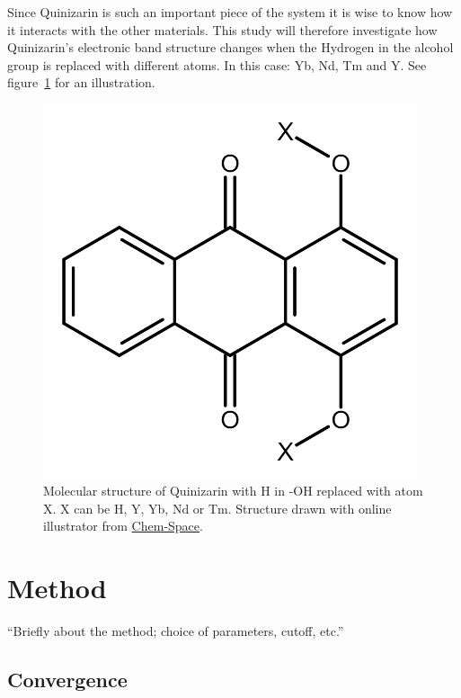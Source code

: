 \documentclass{article}
\begin{document}
    Since Quinizarin is such an important piece of the system it is wise to know how it interacts with the other materials. This study will therefore investigate how Quinizarin's electronic band structure changes when the Hydrogen in the alcohol group is replaced with different atoms. In this case: Yb, Nd, Tm and Y. See figure~\ref{fig:Quinizarin-X} for an illustration.\\

    \begin{figure}[H]
        \centering
        \includegraphics[width = 11cm]{../fig/quinizarin-x.png}
        \caption{Molecular structure of Quinizarin with H in -OH replaced with atom X. X can be H, Y, Yb, Nd or Tm. Structure drawn with online illustrator from \href{https://chem-space.com/search}{Chem-Space}.}
        \label{fig:Quinizarin-X}
    \end{figure}

\vspace{1cm}

\section{Method}    \label{sec:Method}

  ``Briefly about the method; choice of parameters, cutoff, etc.''

  \subsection{Convergence}
\end{document}
